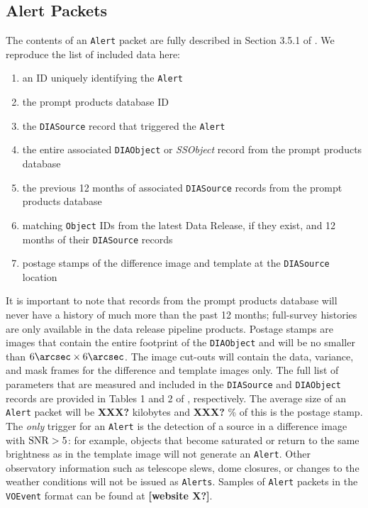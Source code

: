 \subsection{Alert Packets}\label{ssec:packets}

The contents of an {\tt Alert} packet are fully described in Section 3.5.1 of . We reproduce the list of included data here:
\renewcommand{\labelenumi}{\Roman{enumi}.}
\begin{enumerate}
\item an ID uniquely identifying the {\tt Alert}
\item the prompt products database ID
\item the {\tt DIASource} record that triggered the {\tt Alert}
\item the entire associated {\tt DIAObject} or {\it SSObject} record from the prompt products database
\item the previous 12 months of associated {\tt DIASource} records from the prompt products database
\item matching {\tt Object} IDs from the latest Data Release, if they exist, and 12 months of their {\tt DIASource} records
\item postage stamps of the difference image and template at the {\tt DIASource} location
\end{enumerate}

It is important to note that records from the prompt products database will never have a history of much more than the past 12 months; full-survey histories are only available in the data release pipeline products.
Postage stamps are images that contain the entire footprint of the {\tt DIAObject} and will be no smaller than $6\arcsec \times 6\arcsec$.
The image cut-outs will contain the data, variance, and mask frames for the difference and template images only.
The full list of parameters that are measured and included in the {\tt DIASource} and {\tt DIAObject} records are provided in Tables 1 and 2 of , respectively.
The average size of an {\tt Alert} packet will be {\bf XXX?} kilobytes and {\bf XXX?} \% of this is the postage stamp.
The {\em only} trigger for an {\tt Alert} is the detection of a source in a difference image with ${\rm SNR} > 5$: for example, objects that become saturated or return to the same brightness as in the template image will not generate an {\tt Alert}.
Other observatory information such as telescope slews, dome closures, or changes to the weather conditions will not be issued as {\tt Alerts}.
Samples of {\tt Alert} packets in the {\tt VOEvent} format can be found at {\bf [website X?]}.

